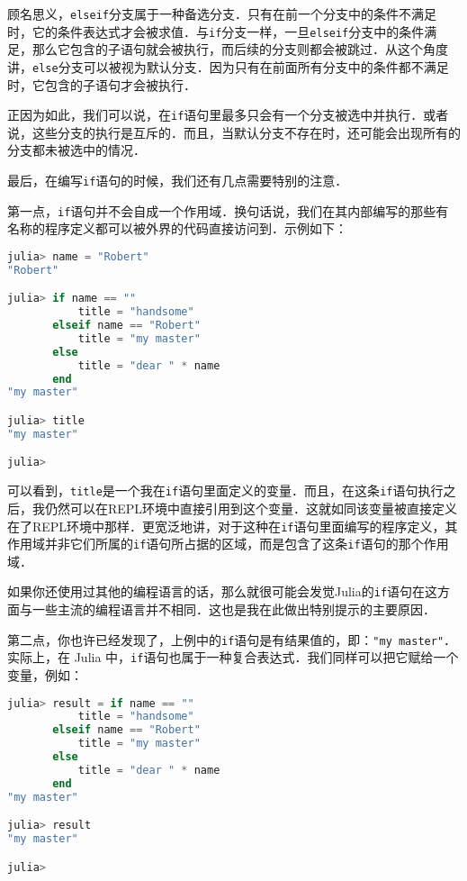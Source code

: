 顾名思义，\verb|elseif|分支属于一种备选分支．只有在前一个分支中的条件不满足时，它的条件表达式才会被求值．与\verb|if|分支一样，一旦\verb|elseif|分支中的条件满足，那么它包含的子语句就会被执行，而后续的分支则都会被跳过．从这个角度讲，\verb|else|分支可以被视为默认分支．因为只有在前面所有分支中的条件都不满足时，它包含的子语句才会被执行．

正因为如此，我们可以说，在\verb|if|语句里最多只会有一个分支被选中并执行．或者说，这些分支的执行是互斥的．而且，当默认分支不存在时，还可能会出现所有的分支都未被选中的情况．

最后，在编写\verb|if|语句的时候，我们还有几点需要特别的注意．

第一点，\verb|if|语句并不会自成一个作用域．换句话说，我们在其内部编写的那些有名称的程序定义都可以被外界的代码直接访问到．示例如下：

\begin{lstlisting}[language=julia]
julia> name = "Robert"
"Robert"

julia> if name == ""
           title = "handsome"
       elseif name == "Robert"
           title = "my master"
       else
           title = "dear " * name
       end
"my master"

julia> title
"my master"

julia> 
\end{lstlisting}

可以看到，\verb|title|是一个我在\verb|if|语句里面定义的变量．而且，在这条\verb|if|语句执行之后，我仍然可以在REPL环境中直接引用到这个变量．这就如同该变量被直接定义在了REPL环境中那样．更宽泛地讲，对于这种在\verb|if|语句里面编写的程序定义，其作用域并非它们所属的\verb|if|语句所占据的区域，而是包含了这条\verb|if|语句的那个作用域．

如果你还使用过其他的编程语言的话，那么就很可能会发觉Julia的\verb|if|语句在这方面与一些主流的编程语言并不相同．这也是我在此做出特别提示的主要原因．

第二点，你也许已经发现了，上例中的\verb|if|语句是有结果值的，即：\verb|"my master"|．实际上，在 Julia 中，\verb|if|语句也属于一种复合表达式．我们同样可以把它赋给一个变量，例如：

\begin{lstlisting}[language=julia]
julia> result = if name == ""
           title = "handsome"
       elseif name == "Robert"
           title = "my master"
       else
           title = "dear " * name
       end
"my master"

julia> result
"my master"

julia> 
\end{lstlisting}

